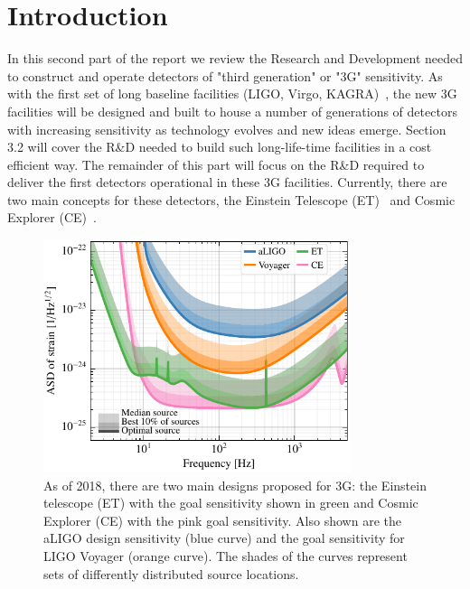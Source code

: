 \chapter{Introduction}
\label{sec:Intro}

In this second part of the report we review the Research and Development needed to construct and operate detectors of "third generation" or "3G" sensitivity. As with the first set of long baseline facilities (LIGO, Virgo, KAGRA)~\cite{AdvancedVirgo2015,AdvancedLIGO2015,KAGRA2013}, the new 3G facilities will be designed and built to house a number of generations of detectors with increasing sensitivity as technology evolves and new ideas emerge. Section 3.2 will cover the R\&D needed to build such long-life-time facilities in a cost efficient way. The remainder of this part will focus on the R\&D required to deliver the first detectors operational in these 3G facilities. Currently, there are two main concepts for these detectors, the Einstein Telescope (ET)~\cite{ET2011} and Cosmic Explorer (CE)~\cite{CosmicExplorer2017}.

\begin{figure}[ht]
\centering
\includegraphics*[width= 0.8\textwidth]{Figures/noises_percentiles.pdf}
\caption{As of 2018, there are two main designs proposed for 3G:  the Einstein telescope (ET) \cite{ET2011} with the goal sensitivity shown in green and Cosmic Explorer (CE) \cite{CosmicExplorer2017} with the pink goal sensitivity.  Also shown are the aLIGO design sensitivity (blue curve) and the goal sensitivity for LIGO Voyager (orange curve). The shades of the curves represent sets of differently distributed source locations.}
\label{fig:3GSens}
\end{figure}

